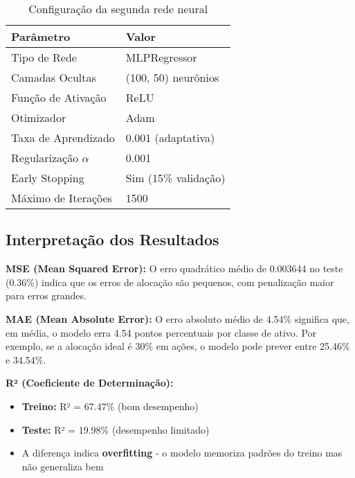\begin{table}[h!]
\centering
\caption{Configuração da segunda rede neural}
\label{tab:arquitetura}
\begin{tabular}{ll}
\toprule
\textbf{Parâmetro} & \textbf{Valor} \\
\midrule
Tipo de Rede & MLPRegressor \\
Camadas Ocultas & (100, 50) neurônios \\
Função de Ativação & ReLU \\
Otimizador & Adam \\
Taxa de Aprendizado & 0.001 (adaptativa) \\
Regularização $\alpha$ & 0.001 \\
Early Stopping & Sim (15\% validação) \\
Máximo de Iterações & 1500 \\
\bottomrule
\end{tabular}
\end{table}


\subsection*{Interpretação dos Resultados}

\textbf{MSE (Mean Squared Error):}
O erro quadrático médio de 0.003644 no teste (0.36\%) indica que os erros de alocação são pequenos, com penalização maior para erros grandes.

\textbf{MAE (Mean Absolute Error):}
O erro absoluto médio de 4.54\% significa que, em média, o modelo erra 4.54 pontos percentuais por classe de ativo. Por exemplo, se a alocação ideal é 30\% em ações, o modelo pode prever entre 25.46\% e 34.54\%.

\textbf{R² (Coeficiente de Determinação):}
\begin{itemize}
    \item \textbf{Treino:} R² = 67.47\% (bom desempenho)
    \item \textbf{Teste:} R² = 19.98\% (desempenho limitado)
    \item A diferença indica \textbf{overfitting} - o modelo memoriza padrões do treino mas não generaliza bem
\end{itemize}

